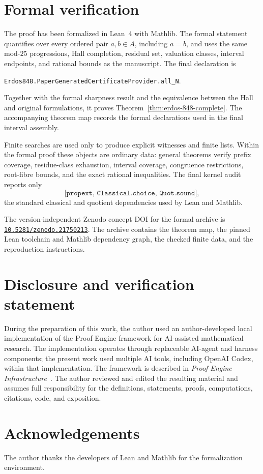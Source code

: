 \documentclass[11pt]{article}
\theoremstyle{definition}
\begin{document}
\section{Formal verification}
\label{sec:machine-proof}

The proof has been formalized in Lean~4 with Mathlib.  The formal statement quantifies over every ordered pair
$a,b\in A$, including $a=b$, and uses the same mod-$25$ progressions, Hall
completion, residual set, valuation classes, interval endpoints, and rational
bounds as the manuscript.  The final declaration is
\begin{center}\small
\texttt{Erdos848.PaperGeneratedCertificateProvider.all\_N}.
\end{center}
Together with the formal sharpness result and the equivalence between the Hall
and original formulations, it proves Theorem~\ref{thm:erdos-848-complete}.
The accompanying theorem map records the formal declarations used in the final
interval assembly.

Finite searches are used only to produce explicit witnesses and finite lists.
Within the formal proof these objects are ordinary data: general theorems
verify prefix coverage, residue-class exhaustion, interval coverage,
congruence restrictions, root-fibre bounds, and the exact rational
inequalities.  The final kernel audit reports only
\[
 \texttt{[propext, Classical.choice, Quot.sound]},
\]
the standard classical and quotient dependencies used by Lean and Mathlib.

The version-independent Zenodo concept DOI for the formal archive is
\href{https://doi.org/10.5281/zenodo.21750213}%
{\nolinkurl{10.5281/zenodo.21750213}}.  The archive contains the theorem map,
the pinned Lean toolchain and Mathlib dependency graph, the checked finite
data, and the reproduction instructions.

\section*{Disclosure and verification statement}

During the preparation of this work, the author used an author-developed local
implementation of the Proof Engine framework for AI-assisted mathematical
research.  The implementation operates through replaceable AI-agent and
harness components; the present work used multiple AI tools, including OpenAI
Codex, within that implementation.  The framework is described in
\emph{Proof Engine Infrastructure}~\cite{LiProofEngine2026}.  The author
reviewed and edited the resulting material and assumes full responsibility for
the definitions, statements, proofs, computations, citations, code, and
exposition.

\section*{Acknowledgements}

The author thanks the developers of Lean and Mathlib for the formalization
environment.



\end{document}
